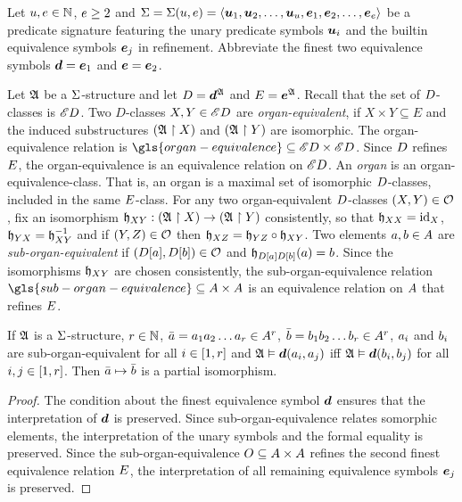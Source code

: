 
Let $u, e \in \mathbb{N}$, $e \geq 2$ and
$\mathrm{\Sigma} = \mathrm{\Sigma}(u, e) = 
\left\langle \bm{u}_{1},\bm{u}_{2},\dots,\bm{u}_{u},\bm{e}_{1},\bm{e}_{2},\dots,\bm{e}_{e} \right\rangle$
be a predicate signature featuring the unary predicate symbols $\bm{u}_{i}$
and the builtin equivalence symbols $\bm{e}_{j}$ in refinement.
Abbreviate the finest two equivalence symbols $\bm{d} = \bm{e}_{1}$ and $\bm{e} = \bm{e}_{2}$.
\begin{definition}
Let $\mathfrak{A}$ be a $\mathrm{\Sigma}$-structure and let $D = \bm{d}^{\mathfrak{A}}$ and
$E = \bm{e}^{\mathfrak{A}}$.
Recall that the set of $D$-classes is ${\mathscr{E}D}$.
Two $D$-classes $X, Y \in {\mathscr{E}D}$ are \emph{organ-equivalent},
if $X \times Y \subseteq E$ and the induced substructures 
$(\mathfrak{A} \restriction X)$ and $(\mathfrak{A} \restriction Y)$ are isomorphic.
The organ-equivalence relation is
$\gls{organ-equivalence} \subseteq \domXX{\Ecl\relD}$.
Since $D$ refines $E$, the organ-equivalence is an equivalence relation
on ${\mathscr{E}D}$.
An \emph{organ} is an organ-equivalence-class. That is, an organ
is a maximal set of isomorphic $D$-classes, included in the same
$E$-class.
For any two organ-equivalent $D$-classes $(X, Y) \in \mathcal{O}$,
fix an isomorphism
$\mathfrak{h}_{XY} : (\mathfrak{A} \restriction X) \to (\mathfrak{A} \restriction Y)$
consistently, so that $\mathfrak{h}_{XX} = \operatorname{id}_{X}$,
$\mathfrak{h}_{YX} = \mathfrak{h}_{XY}^{-1}$
and if $(Y, Z) \in \mathcal{O}$ then
$\mathfrak{h}_{XZ} = \mathfrak{h}_{YZ} \circ \mathfrak{h}_{XY}$.
Two elements $a, b \in A$ are \emph{sub-organ-equivalent}
if $(D[a], D[b]) \in \mathcal{O}$ and
$\mathfrak{h}_{D[a]D[b]}(a) = b$.
Since the isomorphisms $\mathfrak{h}_{XY}$ are chosen consistently, the
sub-organ-equivalence relation
$\gls{sub-organ-equivalence} \subseteq \domAA$ is an equivalence relation on
$A$ that refines $E$.
\end{definition}

\begin{remark}\label{rem:monadic-same-organ-iso}
If $\mathfrak{A}$ is a $\mathrm{\Sigma}$-structure, $r \in \mathbb{N}$,
$\bar{a} = a_{1}a_{2}\dots a_{r} \in A^r$,
$\bar{b} = b_{1}b_{2}\dots b_{r} \in A^r$,
$a_{i}$ and $b_{i}$ are sub-organ-equivalent for all $i \in [1,r]$ and
$\mathfrak{A} \vDash \bm{d}(a_{i}, a_{j})$ iff $\mathfrak{A} \vDash \bm{d}(b_{i}, b_{j})$
for all $i, j \in [1,r]$.
Then $\bar{a} \mapsto \bar{b}$ is a partial isomorphism.
\end{remark}
\begin{proof}
The condition about the finest equivalence symbol $\bm{d}$ ensures that the
interpretation of $\bm{d}$ is preserved.
Since sub-organ-equivalence relates somorphic elements, the interpretation of
the unary symbols and the formal equality is preserved.
Since the sub-organ-equivalence $O \subseteq {A\times A}$ refines the
second finest equivalence relation $E$, the interpretation of all remaining
equivalence symbols $\bm{e}_{j}$ is preserved.
\end{proof}

